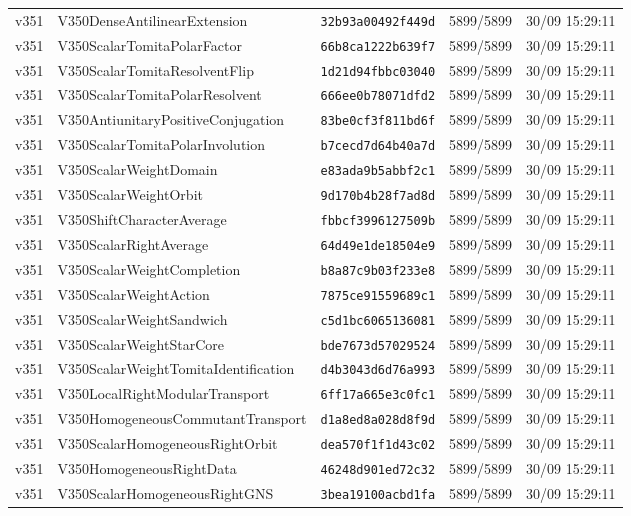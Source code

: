 \documentclass[11pt]{article}
\theoremstyle{definition}\newtheorem{deriv}{Derivação}
\begin{document}
{\begin{longtable}{@{}lllll@{}}
v351 & V350DenseAntilinearExtension & \texttt{32b93a00492f449d} & 5899/5899 & 30/09 15:29:11 \\
v351 & V350ScalarTomitaPolarFactor & \texttt{66b8ca1222b639f7} & 5899/5899 & 30/09 15:29:11 \\
v351 & V350ScalarTomitaResolventFlip & \texttt{1d21d94fbbc03040} & 5899/5899 & 30/09 15:29:11 \\
v351 & V350ScalarTomitaPolarResolvent & \texttt{666ee0b78071dfd2} & 5899/5899 & 30/09 15:29:11 \\
v351 & V350AntiunitaryPositiveConjugation & \texttt{83be0cf3f811bd6f} & 5899/5899 & 30/09 15:29:11 \\
v351 & V350ScalarTomitaPolarInvolution & \texttt{b7cecd7d64b40a7d} & 5899/5899 & 30/09 15:29:11 \\
v351 & V350ScalarWeightDomain & \texttt{e83ada9b5abbf2c1} & 5899/5899 & 30/09 15:29:11 \\
v351 & V350ScalarWeightOrbit & \texttt{9d170b4b28f7ad8d} & 5899/5899 & 30/09 15:29:11 \\
v351 & V350ShiftCharacterAverage & \texttt{fbbcf3996127509b} & 5899/5899 & 30/09 15:29:11 \\
v351 & V350ScalarRightAverage & \texttt{64d49e1de18504e9} & 5899/5899 & 30/09 15:29:11 \\
v351 & V350ScalarWeightCompletion & \texttt{b8a87c9b03f233e8} & 5899/5899 & 30/09 15:29:11 \\
v351 & V350ScalarWeightAction & \texttt{7875ce91559689c1} & 5899/5899 & 30/09 15:29:11 \\
v351 & V350ScalarWeightSandwich & \texttt{c5d1bc6065136081} & 5899/5899 & 30/09 15:29:11 \\
v351 & V350ScalarWeightStarCore & \texttt{bde7673d57029524} & 5899/5899 & 30/09 15:29:11 \\
v351 & V350ScalarWeightTomitaIdentification & \texttt{d4b3043d6d76a993} & 5899/5899 & 30/09 15:29:11 \\
v351 & V350LocalRightModularTransport & \texttt{6ff17a665e3c0fc1} & 5899/5899 & 30/09 15:29:11 \\
v351 & V350HomogeneousCommutantTransport & \texttt{d1a8ed8a028d8f9d} & 5899/5899 & 30/09 15:29:11 \\
v351 & V350ScalarHomogeneousRightOrbit & \texttt{dea570f1f1d43c02} & 5899/5899 & 30/09 15:29:11 \\
v351 & V350HomogeneousRightData & \texttt{46248d901ed72c32} & 5899/5899 & 30/09 15:29:11 \\
v351 & V350ScalarHomogeneousRightGNS & \texttt{3bea19100acbd1fa} & 5899/5899 & 30/09 15:29:11 \\

\end{longtable}}
\end{document}

